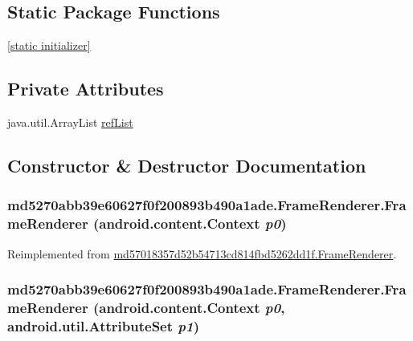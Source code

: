 \subsection*{Static Package Functions}
\begin{CompactItemize}
\item 
\hyperlink{classmd5270abb39e60627f0f200893b490a1ade_1_1_frame_renderer_7c5c8e5bc02ee23d24e2a5e6ffe3392e}{\mbox{[}static initializer\mbox{]}}
\end{CompactItemize}
\subsection*{Private Attributes}
\begin{CompactItemize}
\item 
java.util.ArrayList \hyperlink{classmd5270abb39e60627f0f200893b490a1ade_1_1_frame_renderer_5ed9d00ee3a9f50c03b3bde2a352e936}{refList}
\end{CompactItemize}


\subsection{Constructor \& Destructor Documentation}
\hypertarget{classmd5270abb39e60627f0f200893b490a1ade_1_1_frame_renderer_cee389c5c7dfa4207930e0f43ce1349f}{
\subsubsection[{FrameRenderer}]{\setlength{\rightskip}{0pt plus 5cm}md5270abb39e60627f0f200893b490a1ade.FrameRenderer.FrameRenderer (android.content.Context {\em p0})}}
\label{classmd5270abb39e60627f0f200893b490a1ade_1_1_frame_renderer_cee389c5c7dfa4207930e0f43ce1349f}




Reimplemented from \hyperlink{classmd57018357d52b54713cd814fbd5262dd1f_1_1_frame_renderer_d9ccbd927d3475ddc5925f7a5ac54325}{md57018357d52b54713cd814fbd5262dd1f.FrameRenderer}.\hypertarget{classmd5270abb39e60627f0f200893b490a1ade_1_1_frame_renderer_ea6c9c6c24382a82ce1dec0437826cbc}{
\subsubsection[{FrameRenderer}]{\setlength{\rightskip}{0pt plus 5cm}md5270abb39e60627f0f200893b490a1ade.FrameRenderer.FrameRenderer (android.content.Context {\em p0}, \/  android.util.AttributeSet {\em p1})}}
\label{classmd5270abb39e60627f0f200893b490a1ade_1_1_frame_renderer_ea6c9c6c24382a82ce1dec0437826cbc}




